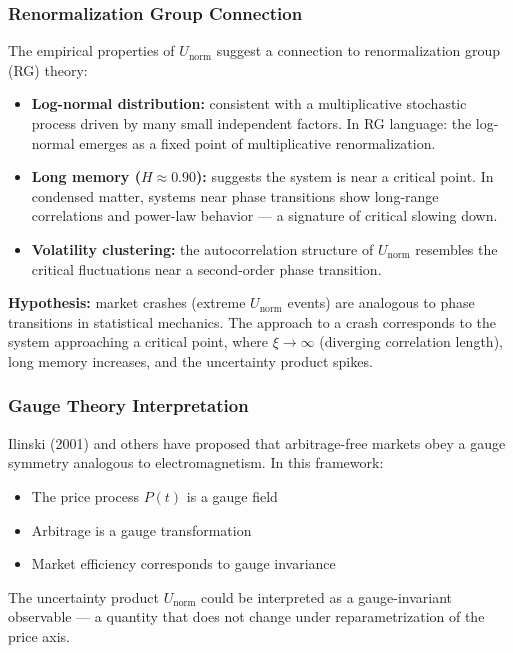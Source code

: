 \documentclass[preprint,12pt]{elsarticle}
\begin{document}
\subsubsection{Renormalization Group Connection}

The empirical properties of $U_\mathrm{norm}$ suggest a connection to renormalization group (RG) theory:

\begin{itemize}
    \item \textbf{Log-normal distribution:} consistent with a multiplicative stochastic process driven by many small independent factors. In RG language: the log-normal emerges as a fixed point of multiplicative renormalization.
    \item \textbf{Long memory ($H \approx 0.90$):} suggests the system is near a critical point. In condensed matter, systems near phase transitions show long-range correlations and power-law behavior --- a signature of critical slowing down.
    \item \textbf{Volatility clustering:} the autocorrelation structure of $U_\mathrm{norm}$ resembles the critical fluctuations near a second-order phase transition.
\end{itemize}

\textbf{Hypothesis:} market crashes (extreme $U_\mathrm{norm}$ events) are analogous to phase transitions in statistical mechanics. The approach to a crash corresponds to the system approaching a critical point, where $\xi \to \infty$ (diverging correlation length), long memory increases, and the uncertainty product spikes.

\subsubsection{Gauge Theory Interpretation}

Ilinski (2001) and others have proposed that arbitrage-free markets obey a gauge symmetry analogous to electromagnetism. In this framework:
\begin{itemize}
    \item The price process $P(t)$ is a gauge field
    \item Arbitrage is a gauge transformation
    \item Market efficiency corresponds to gauge invariance
\end{itemize}
The uncertainty product $U_\mathrm{norm}$ could be interpreted as a gauge-invariant observable --- a quantity that does not change under reparametrization of the price axis.
\end{document}
